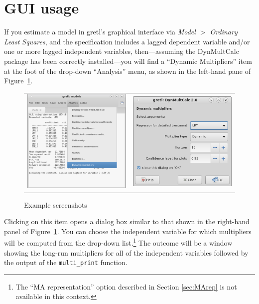 \documentclass[a4paper,10pt]{article}
\begin{document}
\section{GUI usage}
\label{sec:GUI}

If you estimate a model in gretl's graphical interface via \emph{Model
  $>$ Ordinary Least Squares}, and the specification includes a lagged
dependent variable and/or one or more lagged independent variables,
then---assuming the \textsf{DynMultCalc} package has been correctly
installed---you will find a ``Dynamic Multipliers'' item at the foot
of the drop-down ``Analysis'' menu, as shown in the left-hand pane of
Figure~\ref{fig:sshot}.

\begin{figure}[hbtp]
  \caption{Example screenshots}
  \label{fig:sshot}
  \begin{center}
  \begin{tabular}{cc}
    \includegraphics[width=6cm]{modelwin.png} &
    \includegraphics[width=6cm]{GUI_main.png}
  \end{tabular}
  \end{center}
\end{figure}

Clicking on this item opens a dialog box similar to that shown in the
right-hand panel of Figure~\ref{fig:sshot}. You can choose the
independent variable for which multipliers will be computed from the
drop-down list.\footnote{The ``MA representation'' option described in
  Section \ref{sec:MArep} is not available in this context.} The
outcome will be a window showing the long-run multipliers for all of
the independent variables followed by the output of the
\texttt{multi\_print} function.
\end{document}
